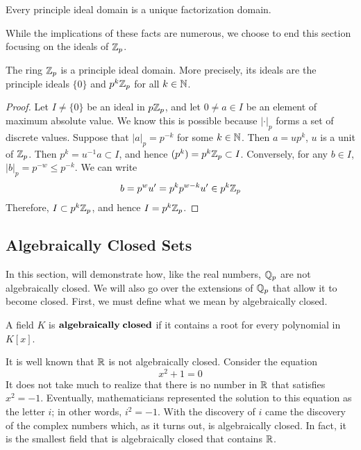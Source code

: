 \documentclass[a4paper]{article}
\begin{document}
\begin{theorem}
Every principle ideal domain is a unique factorization domain.
\end{theorem}

While the implications of these facts are numerous, we choose to end 
this section focusing on the ideals of $\mathbb Z_p$. 

\begin{proposition}
The ring $\mathbb Z_p$ is a principle ideal domain.  More precisely, its 
ideals are the principle ideals $\{0\}$ and $p^k\mathbb Z_p$ for all
$k\in\mathbb N$.
\end{proposition}
\begin{proof}
Let $I\neq\{0\}$ be an ideal in $p\mathbb Z_p$, and let $0\neq a\in I$ be an element of maximum absolute value.  We know this is possible because 
$|\cdot|_p$ forms a set of discrete values.  Suppose that $|a|_p=p^{-k}$
for some $k\in\mathbb N$.  Then $a=up^k$, $u$ is a unit of $\mathbb Z_p$.  Then 
$p^k=u^{-1}a\subset I$, and hence $(p^k)=p^k\mathbb Z_p\subset I$.  Conversely, for any $b\in I$, $|b|_p=p^{-w}\leq p^{-k}$. We can write
\[
	b=p^wu'=p^kp^{w-k}u'\in p^k\mathbb Z_p
\]
Therefore, $I\subset p^k\mathbb Z_p$, and hence $I=p^k\mathbb Z_p$.
\end{proof}

\subsection{Algebraically Closed Sets}

In this section, will demonstrate how, like the real numbers, 
$\mathbb Q_p$ are not algebraically closed.  We will also go over the
extensions of $\mathbb Q_p$ that allow it to become closed.  First, we 
must define what we mean by algebraically closed.

\begin{definition}
A field $K$ is $\bf{algebraically\;closed}$ if it contains a root for 
every polynomial in $K[x]$.
\end{definition}

It is well known that $\mathbb R$ is not algebraically closed.  Consider
the equation
\[
	x^2+1=0
\]
It does not take much to realize that there is no number in $\mathbb R$
that satisfies $x^2=-1$.  Eventually, mathematicians represented the
solution to this equation as the letter $i$; in other words, $i^2=-1$. 
With the discovery of $i$ came the discovery of the complex numbers
which, as it turns out, is algebraically closed.  In fact, it is the
smallest field that is algebraically closed that contains $\mathbb R$.
\end{document}
